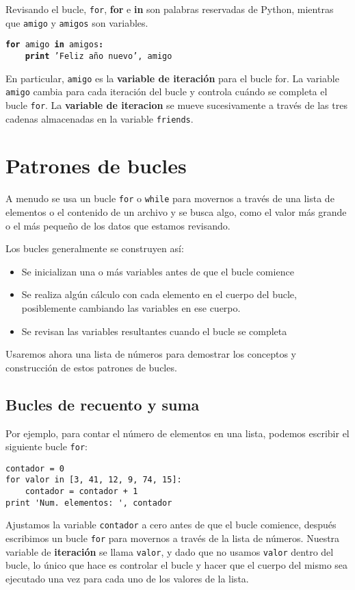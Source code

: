 Revisando el bucle, {\tt for}, {\bf for} e {\bf in} son palabras
reservadas de Python, mientras que {\tt amigo} y {\tt amigos} son variables.

{\tt {\bf for} amigo {\bf in} amigos{\bf :}\\
\verb"    "{\bf print} 'Feliz año nuevo', amigo }

En particular, {\tt amigo} es la {\bf variable de iteración} para
el bucle for. La variable {\tt amigo} cambia para cada iteración del
bucle y controla cuándo se completa el bucle {\tt for}. La
{\bf variable de iteracion} se mueve sucesivamente a través de
las tres cadenas almacenadas en la variable {\tt friends}.


\section{Patrones de bucles}

A menudo se usa un bucle {\tt for} o {\tt while} para movernos a través de una lista de elementos
o el contenido de un archivo y se busca algo, como el valor
más grande o el más pequeño de los datos que estamos revisando.

Los bucles generalmente se construyen así:

\begin{itemize}

\item Se inicializan una o más variables antes de que el bucle comience

\item Se realiza algún cálculo con cada elemento en el cuerpo del bucle,
posiblemente cambiando las variables en ese cuerpo.

\item Se revisan las variables resultantes cuando el bucle se completa

\end{itemize}

Usaremos ahora una lista de números para demostrar los conceptos y construcción
de estos patrones de bucles.

\subsection{Bucles de recuento y suma}

Por ejemplo, para contar el número de elementos
en una lista, podemos escribir el siguiente bucle {\tt for}:

\beforeverb
\begin{verbatim}
contador = 0
for valor in [3, 41, 12, 9, 74, 15]:
    contador = contador + 1
print 'Num. elementos: ', contador
\end{verbatim}
\afterverb
%
Ajustamos la variable {\tt contador} a cero antes de que el bucle comience,
después escribimos un bucle {\tt for} para movernos a través de la lista de números.
Nuestra variable de {\bf iteración} se llama {\tt valor}, y dado que no
usamos {\tt valor} dentro del bucle, lo único que hace es controlar el bucle
y hacer que el cuerpo del mismo sea ejecutado una vez para cada uno de los
valores de la lista.

